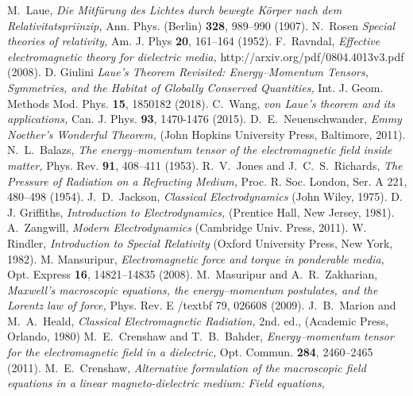 \documentclass[twocolumn,amssymb,eqsecnum,aps,pra]{revtex4-2}
\begin{document}
\begin{thebibliography}{1}
M.~Laue, 
\textit{Die {M}itf\"urung des {L}ichtes durch bewegte {K}\"orper nach dem {R}elativitatspriinzip,}
Ann. Phys. (Berlin)
\textbf{328}, 989--990 (1907).
N.~Rosen
\textit{Special theories of relativity,}
Am. J. Phys
\textbf{20}, 161--164 (1952).
F.~Ravndal,
\textit{Effective electromagnetic theory for dielectric media,}
http://arxiv.org/pdf/0804.4013v3.pdf (2008).
D. Giulini
\textit{Laue's {T}heorem {R}evisited: {E}nergy--{M}omentum {T}ensors, {S}ymmetries, and the {H}abitat of {G}lobally {C}onserved {Q}uantities,}
Int. J. Geom. Methods Mod. Phys.
\textbf{15}, 1850182 (2018).
C.~Wang,
\textit{von {L}aue's theorem and its applications,}
Can. J. Phys.
\textbf{93}, 1470-1476 (2015).
D.~E.~Neuenschwander,
\textit{Emmy {N}oether's {W}onderful {T}heorem,}
(John Hopkins University Press, Baltimore, 2011).
N.~L.~Balazs, 
\textit{The energy--momentum tensor of the electromagnetic field inside matter,}
Phys. Rev. 
\textbf{91}, 408--411 (1953).
R.~V.~Jones and J.~C.~S.~Richards,
\textit{The Pressure of Radiation on a Refracting Medium,}
Proc. R. Soc. London, Ser. A 221, 480--498 (1954).
J.~D.~Jackson,
\textit{Classical {E}lectrodynamics}
(John Wiley, 1975).
D. J. Griffiths,
\textit{Introduction to {E}lectrodynamics,}
(Prentice Hall, New Jersey, 1981).
A.~Zangwill,
\textit {Modern {E}lectrodynamics}
(Cambridge Univ. Press, 2011).
W. Rindler,
\textit{Introduction to {S}pecial {R}elativity}
(Oxford University Press, New York, 1982).
M. Mansuripur,
\textit{Electromagnetic force and torque in ponderable media,}
Opt. Express
\textbf{16}, 14821--14835 (2008).
M.~Masuripur and A.~R.~Zakharian,
\textit{Maxwell's macroscopic equations, the energy--momentum postulates, and the {L}orentz law of force,}
Phys. Rev. E
/textbf {79}, 026608 (2009). 
J.~B.~Marion and M.~A.~Heald,
\textit{Classical {E}lectromagnetic {R}adiation,} 2nd. ed.,
(Academic Press, Orlando, 1980)
M.~E.~Crenshaw and T.~B.~Bahder,
\textit{Energy--momentum tensor for the electromagnetic field in a dielectric,}
Opt. Commun.
\textbf {284}, 2460--2465 (2011).
M.~E.~Crenshaw,
\textit{Alternative formulation of the macroscopic field equations in a linear magneto-dielectric medium: Field equations,}

\end{thebibliography}
\end{document}
